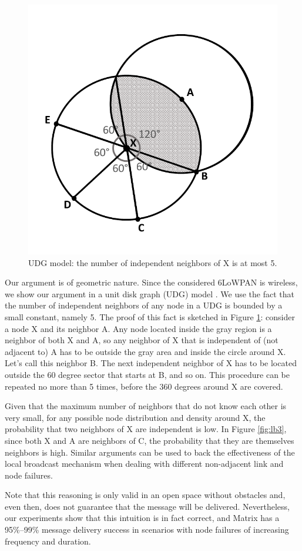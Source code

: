 \begin{figure}[!ht]
    \centering
    \includegraphics[width=.6\linewidth]{./Images/localbroad.pdf}
\caption{UDG model: the number of independent neighbors of X is at most 5.}
    \label{fig:udgIndN}
\end{figure}

Our argument is of geometric nature. Since the considered 6LoWPAN is
wireless, we show our argument in a unit disk graph (UDG) model
\cite{Clark:1991}. We use the fact that the number of independent neighbors of
any node in a UDG is bounded by a small constant, namely 5. The proof of this
fact is sketched in Figure \ref{fig:udgIndN}: consider a node X and its neighbor
A. Any node located inside the gray region is a neighbor of both X and A, so any
neighbor of X that is independent of (not adjacent to) A has to be outside the
gray area and inside the circle around X. Let's call this neighbor B. The next
independent neighbor of X has to be located outside the 60 degree sector that
starts at B, and so on. This procedure can be repeated no more than 5 times,
before the 360 degrees around X are covered.

Given that the maximum number of neighbors that do not know each
other is very small, for any possible node distribution and density
around X, the probability that two neighbors of X are independent is
low. In Figure \ref{fig:lb3}, since both X and A are neighbors of C,
the probability that they are themselves neighbors is high. Similar
arguments can be used to back the effectiveness of the local
broadcast mechanism when dealing with different non-adjacent link
and node failures.

Note that this reasoning is only valid in an open space without obstacles and,
even then, does not guarantee that the message will be delivered. Nevertheless,
our experiments show that this intuition is in fact correct, and Matrix has a
95\%--99\% message delivery success in scenarios with node failures of
increasing frequency and duration.